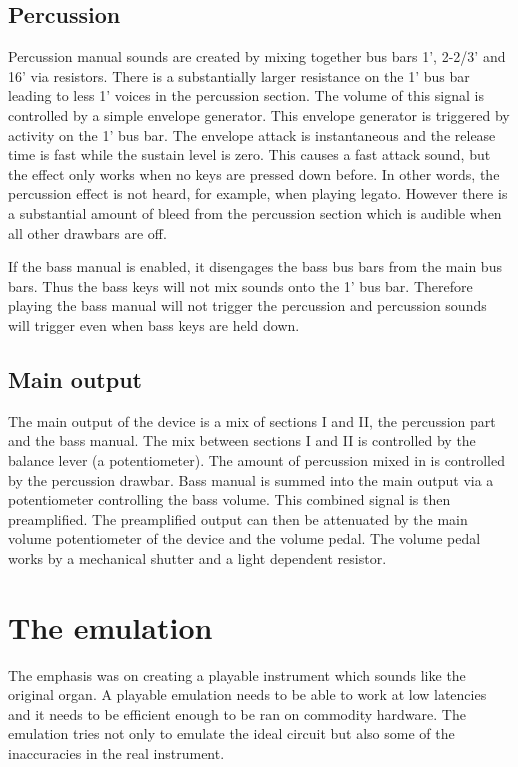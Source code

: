 \documentclass[11pt,a4paper]{article}
\begin{document}
\subsection{Percussion}

Percussion manual sounds are created by mixing together bus bars 1', 2-2/3' and 16' via resistors. There is a substantially larger resistance on the 1' bus bar leading to less 1' voices in the percussion section. The volume of this signal is controlled by a simple envelope generator. This envelope generator is triggered by activity on the 1' bus bar. The envelope attack is instantaneous and the release time is fast while the sustain level is zero. This causes a fast attack sound, but the effect only works when no keys are pressed down before. In other words, the percussion effect is not heard, for example, when playing legato. However there is a substantial amount of bleed from the percussion section which is audible when all other drawbars are off.

If the bass manual is enabled, it disengages the bass bus bars from the main bus bars. Thus the bass keys will not mix sounds onto the 1' bus bar. Therefore playing the bass manual will not trigger the percussion and percussion sounds will trigger even when bass keys are held down.

\subsection{Main output}

The main output of the device is a mix of sections I and II, the percussion part and the bass manual. The mix between sections I and II is controlled by the balance lever (a potentiometer). The amount of percussion mixed in is controlled by the percussion drawbar. Bass manual is summed into the main output via a potentiometer controlling the bass volume. This combined signal is then preamplified. The preamplified output can then be attenuated by the main volume potentiometer of the device and the volume pedal. The volume pedal works by a mechanical shutter and a light dependent resistor.

\section{The emulation} 

The emphasis was on creating a playable instrument which sounds like the original organ. A playable emulation needs to be able to work at low latencies and it needs to be efficient enough to be ran on commodity hardware. The emulation tries not only to emulate the ideal circuit but also some of the inaccuracies in the real instrument. 
\end{document}
